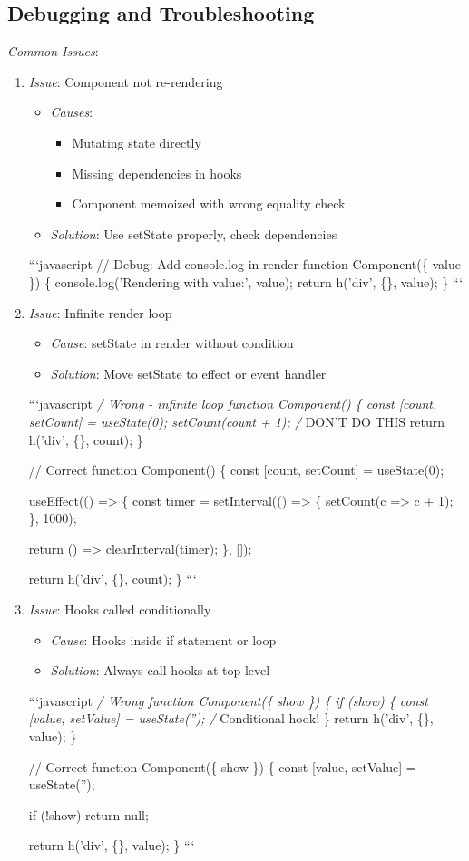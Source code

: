 \documentclass[11pt]{article}
\begin{document}
\subsection{Debugging and Troubleshooting}
\label{sec:org2fd09cf}

\emph{Common Issues}:

\begin{enumerate}
\item \emph{Issue}: Component not re-rendering
\begin{itemize}
\item \emph{Causes}: 
\begin{itemize}
\item Mutating state directly
\item Missing dependencies in hooks
\item Component memoized with wrong equality check
\end{itemize}
\item \emph{Solution}: Use setState properly, check dependencies
\end{itemize}
```javascript
// Debug: Add console.log in render
function Component(\{ value \}) \{
  console.log('Rendering with value:', value);
  return h('div', \{\}, value);
\}
```

\item \emph{Issue}: Infinite render loop
\begin{itemize}
\item \emph{Cause}: setState in render without condition
\item \emph{Solution}: Move setState to effect or event handler
\end{itemize}
```javascript
\emph{/ Wrong - infinite loop
function Component() \{
  const [count, setCount] = useState(0);
  setCount(count + 1); /} DON'T DO THIS
  return h('div', \{\}, count);
\}

// Correct
function Component() \{
  const [count, setCount] = useState(0);

useEffect(() => \{
  const timer = setInterval(() => \{
    setCount(c => c + 1);
  \}, 1000);

  return () => clearInterval(timer);
\}, []);

  return h('div', \{\}, count);
\}
```

\item \emph{Issue}: Hooks called conditionally
\begin{itemize}
\item \emph{Cause}: Hooks inside if statement or loop
\item \emph{Solution}: Always call hooks at top level
\end{itemize}
```javascript
\emph{/ Wrong
function Component(\{ show \}) \{
  if (show) \{
    const [value, setValue] = useState(''); /} Conditional hook!
  \}
  return h('div', \{\}, value);
\}

// Correct
function Component(\{ show \}) \{
  const [value, setValue] = useState('');

if (!show) return null;

  return h('div', \{\}, value);
\}
```
\end{enumerate}
\end{document}
